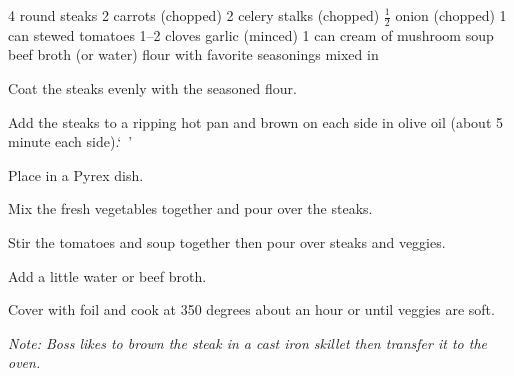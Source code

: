 \dishtype{}
\begin{ingreds}
    4 round steaks
    2 carrots (chopped)
    2 celery stalks (chopped)
    $\frac{1}{2}$ onion (chopped)
    1 can stewed tomatoes
    1--2 cloves garlic (minced)
    1 can cream of mushroom soup
    beef broth (or water)
    flour with favorite seasonings mixed in
\end{ingreds}
\begin{method}
    Coat the steaks evenly with the seasoned flour.\par
    Add the steaks to a ripping hot pan and brown on each side in olive oil (about 5 minute each side).`\ '\par
    Place in a Pyrex\textsuperscript{\textregistered} dish.\par
    Mix the fresh vegetables together and pour over the steaks.\par
    Stir the tomatoes and soup together then pour over steaks and veggies.\par
    Add a little water or beef broth.\par
    Cover with foil and cook at 350 degrees about an hour or until veggies are soft.\par
    \emph{Note: Boss likes to brown the steak in a cast iron skillet then transfer it to the oven.}
\end{method}